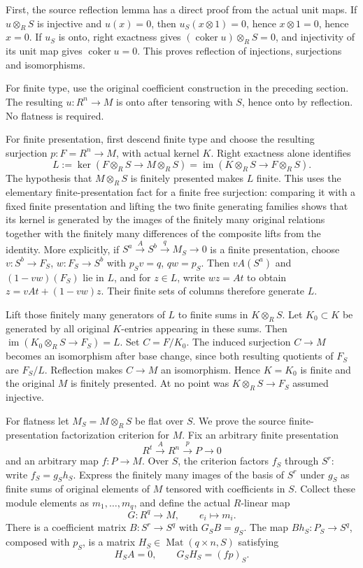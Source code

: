 First, the source reflection lemma has a direct proof from the actual unit maps. If \(u\otimes_RS\) is injective and \(u(x)=0\), then \(u_S(x\otimes1)=0\), hence \(x\otimes1=0\), hence \(x=0\). If \(u_S\) is onto, right exactness gives \((\operatorname{coker}u)\otimes_RS=0\), and injectivity of its unit map gives \(\operatorname{coker}u=0\). This proves reflection of injections, surjections and isomorphisms.

For finite type, use the original coefficient construction in the preceding section. The resulting \(u:R^n\to M\) is onto after tensoring with \(S\), hence onto by reflection. No flatness is required.

For finite presentation, first descend finite type and choose the resulting surjection \(p:F=R^n\to M\), with actual kernel \(K\). Right exactness alone identifies \[
L:=\ker(F\otimes_RS\to M\otimes_RS)
=\operatorname{im}(K\otimes_RS\to F\otimes_RS).
\] The hypothesis that \(M\otimes_RS\) is finitely presented makes \(L\) finite. This uses the elementary finite-presentation fact for a finite free surjection: comparing it with a fixed finite presentation and lifting the two finite generating families shows that its kernel is generated by the images of the finitely many original relations together with the finitely many differences of the composite lifts from the identity. More explicitly, if \(S^a\xrightarrow{A}S^b\xrightarrow{q}M_S\to0\) is a finite presentation, choose \(v:S^b\to F_S\), \(w:F_S\to S^b\) with \(p_Sv=q\), \(qw=p_S\). Then \(vA(S^a)\) and \((1-vw)(F_S)\) lie in \(L\), and for \(z\in L\), write \(wz=A t\) to obtain \(z=vAt+(1-vw)z\). Their finite sets of columns therefore generate \(L\).

Lift those finitely many generators of \(L\) to finite sums in \(K\otimes_RS\). Let \(K_0\subset K\) be generated by all original \(K\)-entries appearing in these sums. Then \(\operatorname{im}(K_0\otimes_RS\to F_S)=L\). Set \(C=F/K_0\). The induced surjection \(C\to M\) becomes an isomorphism after base change, since both resulting quotients of \(F_S\) are \(F_S/L\). Reflection makes \(C\to M\) an isomorphism. Hence \(K=K_0\) is finite and the original \(M\) is finitely presented. At no point was \(K\otimes_RS\to F_S\) assumed injective.

For flatness let \(M_S=M\otimes_RS\) be flat over \(S\). We prove the source finite-presentation factorization criterion for \(M\). Fix an arbitrary finite presentation \[
R^t\xrightarrow{A}R^n\xrightarrow{p}P\to0
\] and an arbitrary map \(f:P\to M\). Over \(S\), the criterion factors \(f_S\) through \(S^r\): write \(f_S=g_Sh_S\). Express the finitely many images of the basis of \(S^r\) under \(g_S\) as finite sums of original elements of \(M\) tensored with coefficients in \(S\). Collect these module elements as \(m_1,\ldots,m_q\), and define the actual \(R\)-linear map \[
G:R^q\to M,\qquad e_i\mapsto m_i.
\] There is a coefficient matrix \(B:S^r\to S^q\) with \(G_SB=g_S\). The map \(Bh_S:P_S\to S^q\), composed with \(p_S\), is a matrix \(H_S\in\operatorname{Mat}(q\times n,S)\) satisfying \[
H_SA=0,\qquad G_SH_S=(fp)_S.
\]

